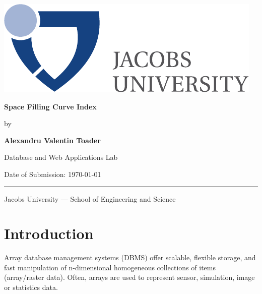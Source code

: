 \documentclass[11pt, a4paper, oneside]{article}
\newcommand{\myname}{Alexandru Valentin Toader}
\newcommand{\mytitle}{Space Filling Curve Index}
\begin{document}

  \thispagestyle{empty}

  \begin{flushright}
   \includegraphics[scale=0.7]{bsc-logo}
  \end{flushright}
  \vspace{20mm}
  \begin{center}
    \huge
    \textbf{\mytitle}
  \end{center}
  \vspace*{4mm}
  \begin{center}
   \Large by
  \end{center}
  \vspace*{4mm}
  \begin{center}
    \Large
    \textbf{\myname}
  \end{center}
  \vspace*{20mm}
  \begin{center}
    \large
    Database and Web Applications Lab
  \end{center}
  \vfill
  \vspace*{8mm}
  \begin{flushleft}
    \large
    Date of Submission: \today \\
    \rule{\textwidth}{1pt}
  \end{flushleft}
  \begin{center}
    \Large Jacobs University --- School of Engineering and Science
  \end{center}

  \newpage


\newpage
\tableofcontents

\clearpage
{}

\section{Introduction}

Array database management systems (DBMS) offer scalable, flexible storage, and fast manipulation of n-dimensional homogeneous collections of items (array/raster data). Often, arrays are used to represent sensor, simulation, image or statistics data. 
\end{document}
